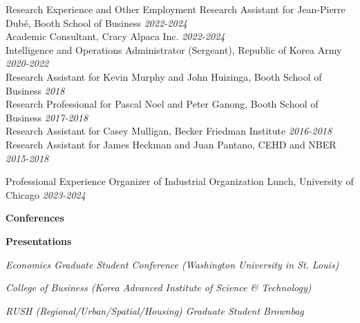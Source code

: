 \documentclass{resume} %
\begin{document}
	\begin{rSection}{Research Experience and Other Employment}
		Research Assistant for Jean-Pierre Dub\'e, Booth School of Business \hfill {\em 2022-2024} \\
		Academic Consultant, Cracy Alpaca Inc. \hfill {\em 2022-2024} \\
		Intelligence and Operations Administrator (Sergeant), Republic of Korea Army \hfill {\em 2020-2022} \\
		Research Assistant for Kevin Murphy and John Huizinga, Booth School of Business \hfill {\em 2018} \\
		Research Professional for Pascal Noel and Peter Ganong, Booth School of Business \hfill {\em 2017-2018} \\
		Research Assistant for Casey Mulligan, Becker Friedman Institute \hfill {\em 2016-2018} \\
		Research Assistant for James Heckman and Juan Pantano, CEHD and NBER \hfill {\em 2015-2018}
	\end{rSection}
	
	\begin{rSection}{Professional Experience}
		Organizer of Industrial Organization Lunch, University of Chicago \hfill {\em 2023-2024}
		
		\begin{minipage}[t]{0.2\textwidth}
			\textbf{Conferences}
			
			\textbf{Presentations}
			
		\end{minipage}
		\begin{minipage}[t]{0.8\textwidth}
			\textit{Economics Graduate Student Conference (Washington University in St. Louis)}
			
			\textit{College of Business (Korea Advanced Institute of Science \& Technology)}
			
			\textit{RUSH (Regional/Urban/Spatial/Housing) Graduate Student Brownbag}
			
		\end{minipage}
	
	\end{rSection}
\end{document}
